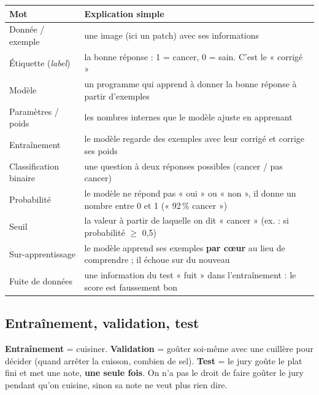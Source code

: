 \documentclass[11pt,a4paper]{article}
\begin{document}
\begin{table}[H]
\centering\small
\begin{tabularx}{\textwidth}{lX}
\toprule
\textbf{Mot} & \textbf{Explication simple} \\
\midrule
Donnée / exemple & une image (ici un patch) avec ses informations \\
Étiquette (\emph{label}) & la bonne réponse : 1 = cancer, 0 = sain. C'est le « corrigé » \\
Modèle & un programme qui apprend à donner la bonne réponse à partir d'exemples \\
Paramètres / poids & les nombres internes que le modèle ajuste en apprenant \\
Entraînement & le modèle regarde des exemples avec leur corrigé et corrige ses poids \\
Classification binaire & une question à deux réponses possibles (cancer / pas cancer) \\
Probabilité & le modèle ne répond pas « oui » ou « non », il donne un nombre entre 0 et 1 (« 92\,\% cancer ») \\
Seuil & la valeur à partir de laquelle on dit « cancer » (ex. : si probabilité $\geq$ 0,5) \\
Sur-apprentissage & le modèle apprend ses exemples \textbf{par cœur} au lieu de comprendre ; il échoue sur du nouveau \\
Fuite de données & une information du test « fuit » dans l'entraînement : le score est faussement bon \\
\bottomrule
\end{tabularx}
\end{table}

\subsection{Entraînement, validation, test}
\begin{analogie}[La cuisine]
\textbf{Entraînement} = cuisiner. \textbf{Validation} = goûter soi-même avec une cuillère pour décider (quand arrêter la
cuisson, combien de sel). \textbf{Test} = le jury goûte le plat fini et met une note, \textbf{une seule fois}. On n'a pas le droit
de faire goûter le jury pendant qu'on cuisine, sinon sa note ne veut plus rien dire.
\end{analogie}
\end{document}
